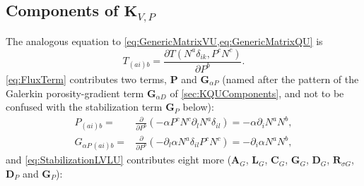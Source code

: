 \subsection{Components of $\mathbf{K}_{V, P}$} \label{sec:KVPComponents}
The analogous equation to \cref{eq:GenericMatrixVU,eq:GenericMatrixQU} is
\begin{equation} \label{eq:GenericMatrixVP}
  T_{(ai)b} = \frac{\partial T(N^a \delta_{ik}, P^c N^c)}{\partial P^b}.
\end{equation}
\cref{eq:FluxTerm} contributes two terms, $\mathbf{P}$ and $\mathbf{G}_{\alpha P}$ (named after the pattern of the Galerkin porosity{\hyp}gradient term $\mathbf{G}_{\alpha D}$ of \cref{sec:KQUComponents}, and not to be confused with the stabilization term $\mathbf{G}_{P}$ below):
\begin{align} \label{eq:PComponents}
  P_{(ai)b} =     & \frac{\partial }{\partial P^b} \left( - \alpha P^c N^c \partial_l N^a \delta_{il} \right) = - \alpha \partial_i N^a N^b, \\
  G_{\alpha P \,(ai)b} = & \frac{\partial }{\partial P^b} \left( - \partial_l \alpha N^a \delta_{il} P^c N^c \right) = - \partial_i \alpha N^a N^b,
\end{align}
and \cref{eq:StabilizationLVLU} contributes eight more ($\mathbf{A}_G$, $\mathbf{L}_G$, $\mathbf{C}_G$, $\mathbf{G}_G$, $\mathbf{D}_G$, $\mathbf{R}_{\sigma G}$, $\mathbf{D}_P$ and $\mathbf{G}_P$):

